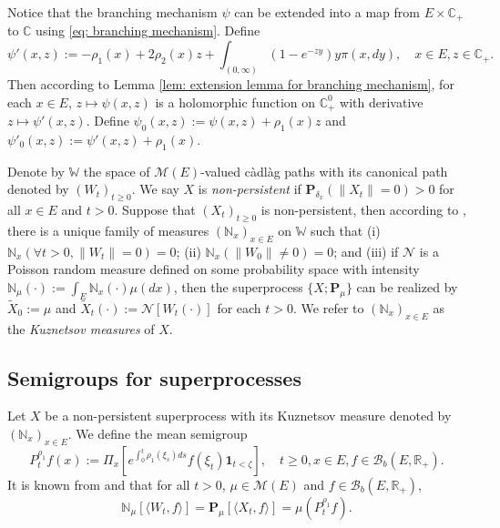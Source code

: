 \documentclass[12pt,a4paper]{amsart}
\theoremstyle{plain}
\theoremstyle{definition}
\numberwithin{equation}{section}
\begin{document}
Notice that the branching mechanism $\psi$ can be extended into a map from $E \times \mathbb C_+$ to $\mathbb C$ using \eqref{eq: branching mechanism}.
Define
\begin{equation}
  \psi'(x,z)
  := - \rho_1(x) + 2\rho_2(x) z + \int_{(0,\infty)} (1-e^{-zy})y\pi(x,dy),
  \quad x\in E, z\in \mathbb C_+.
\end{equation}
Then according to Lemma \ref{lem: extension lemma for branching mechanism}, for each $x \in E$, $z \mapsto \psi(x,z)$ is a holomorphic function on $\mathbb C_+^0$ with derivative $z \mapsto \psi'(x,z)$.
Define $\psi_0(x,z) := \psi(x,z)+ \rho_1(x)z $ and $\psi'_0(x,z) := \psi'(x,z) + \rho_1(x)$.

Denote by $\mathbb W$ the space of $\mathcal M(E)$-valued c\`{a}dl\`{a}g paths with its canonical path denoted by $(W_t)_{t\geq 0}$.
We say $X$ is \emph{non-persistent} if $\mathbf P_{\delta_x}(\|X_t\|= 0) > 0$ for all $x\in E$ and $t> 0$.
Suppose that $(X_t)_{t\geq 0}$ is non-persistent, then according to \cite[Section 8.4]{Li2011Measure-valued}, there is a unique family of measures $(\mathbb N_x)_{x\in E}$ on $\mathbb W$ such that
(i) $\mathbb N_x (\forall t > 0, \|W_t\|=0) =0$;
(ii) $\mathbb N_x(\|W_0 \|\neq 0) = 0$;
and (iii) if $\mathcal N$ is a Poisson random measure defined on some probability space with intensity $\mathbb N_\mu(\cdot):= \int_E \mathbb N_x(\cdot )\mu(dx)$, then the superprocess $\{X;\mathbf P_\mu\}$ can be realized by $\widetilde X_0 := \mu$ and $\widetilde X_t(\cdot) := \mathcal N[W_t(\cdot)]$ for each $t>0$.
We refer to $(\mathbb N_x)_{x\in E}$ as the \emph{Kuznetsov measures} of $X$.

\subsection{Semigroups for superprocesses}
\label{sec: definition of vf}
Let $X$ be a non-persistent superprocess with its Kuznetsov measure denoted by $(\mathbb N_x)_{x\in E}$.
We define the mean semigroup
\begin{equation}
  P_t^{\rho_1} f(x)
  := \Pi_{x}[e^{\int_0^t \rho_1(\xi_s)ds}f(\xi_t) \mathbf 1_{t< \zeta}],
  \quad t\geq 0, x\in E, f\in \mathcal B_b(E,\mathbb R_+).
\end{equation}
It is known from \cite[Proposition 2.27]{Li2011Measure-valued} and \cite[Theorem 2.7]{Kyprianou2014Fluctuations} that for all $t > 0$, $\mu \in \mathcal M(E)$ and $f\in \mathcal B_b(E,\mathbb R_+)$,
\begin{equation}
  \label{eq: mean formula for superprocesses}
  \mathbb N_{\mu}[\langle W_t, f\rangle]
  =\mathbf P_{\mu}[\langle X_t, f\rangle]
  =\mu(P^{\rho_1}_t f).
\end{equation}
\end{document}
